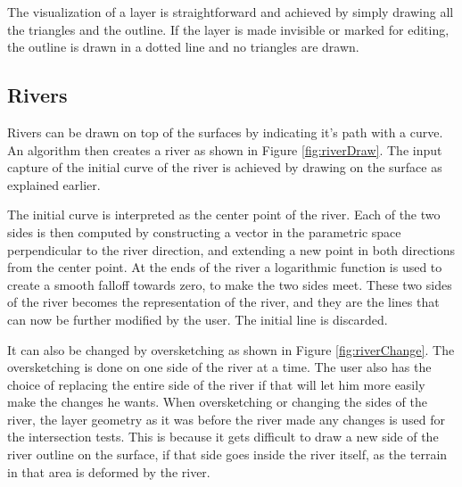 \documentclass[a4paper,12pt]{report}
\begin{document}
The visualization of a layer is straightforward and achieved by simply drawing all the triangles and the outline. If the layer is made invisible or marked for editing, the outline is drawn in a dotted line and no triangles are drawn.

\subsection{Rivers}
Rivers can be drawn on top of the surfaces by indicating it's path with a curve. An algorithm then creates a river as shown in Figure \ref{fig:riverDraw}. 
The input capture of the initial curve of the river is achieved by drawing on the surface as explained earlier.

The initial curve is interpreted as the center point of the river. Each of the two sides is then computed by constructing a vector in the parametric space perpendicular to the river direction, and extending a new point in both directions from the center point. At the ends of the river a logarithmic function is used to create a smooth falloff towards zero, to make the two sides meet. These two sides of the river becomes the representation of the river, and they are the lines that can now be further modified by the user. The initial line is discarded.



It can also be changed by oversketching as shown in Figure \ref{fig:riverChange}. The oversketching is done on one side of the river at a time. The user also has the choice of replacing the entire side of the river if that will let him more easily make the changes he wants.
When oversketching or changing the sides of the river, the layer geometry as it was before the river made any changes is used for the intersection tests. This is because it gets difficult to draw a new side of the river outline on the surface, if that side goes inside the river itself, as the terrain in that area is deformed by the river.
\end{document}
